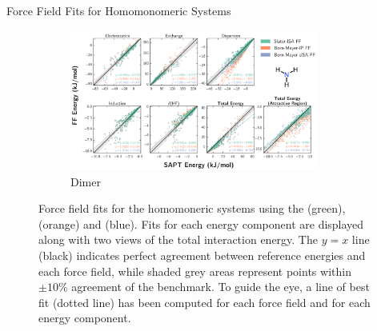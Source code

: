 \begin{section}{Force Field Fits for Homomonomeric Systems}
\begin{figure}
\begin{subfigure}{\textwidth}
    \end{subfigure}
    \end{figure}
    \begin{figure}
    \ContinuedFloat
    \begin{subfigure}{\textwidth}
        \caption{\nh Dimer}
        \includegraphics[width=0.9\textwidth]{isotropic/si/nh3_nh3_scatter.pdf}
    \end{subfigure}
    \caption{
    Force field fits for the homomoneric systems using the \isaffold (green), \saptff
(orange) and \bmsisaff (blue).
    Fits for each energy component are displayed along with two views of the total interaction energy.
    The $y=x$ line (black) indicates perfect agreement between reference energies
    and each force field, while shaded grey areas represent points within $\pm
    10\%$ agreement of the benchmark. To guide the eye, a line of best fit (dotted
    line) has been computed for each force field and for each energy component.
     }
    \label{fig:all-scatter}
    \end{figure}






\end{section}
